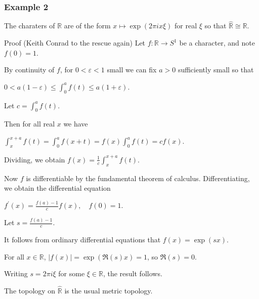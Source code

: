 \documentclass[mathserif
, handout
]{beamer}
\begin{document}
\begin{frame}
    \frametitle{Example 2}
The charaters of $\mathbb{R}$ are of the form $x\mapsto \exp(2\pi i x\xi)$ for real $\xi$ so that $\widehat{\mathbb{R}}\cong\mathbb{R}$.
\pause 
\begin{block}{Proof (Keith Conrad to the rescue again)} %
    Let $f \colon \mathbb{R}\to S^1$ be a character, and note $f(0) = 1$.\pause 

    By continuity of $f$, for $0<\varepsilon<1$ small we can fix $a>0$ sufficiently small so that \begin{center}
        $0<a(1-\varepsilon)\leq \int_0^a f(t)\leq a(1+\varepsilon)$.
    \end{center} Let $c = \int_0^a f(t)$.
\end{block}
\end{frame}

\begin{frame}
    \begin{block}{}
        Then for all real $x$ we have \begin{center}
            $\int_x^{x+a}f(t) = \int_0^a f(x+t) = f(x)\int_0^a f(t) = cf(x)$.
        \end{center} \pause 
        Dividing, we obtain $f(x) = \frac{1}{c}\int_x^{x+a}f(t)$. \pause

        Now $f$ is differentiable by the fundamental theorem of calculus. Differentiating, we obtain the differential equation \begin{center}
            $f^\prime(x) = \frac{f(a)-1}{c} f(x),\quad f(0) = 1$.
        \end{center} Let $s = \frac{f(a)-1}{c}$. \pause 

        It follows from ordinary differential equations that $f(x) = \exp(sx)$. \pause 

        For all $x\in \mathbb{R}$, $|f(x)|= \exp(\Re(s) x)=1$, so $\Re( s) = 0$. \pause 

        Writing $s = 2\pi i \xi$ for some $\xi\in \mathbb{R}$, the result follows. \pushQED{\qed}\qedhere\popQED
    \end{block} The topology on $\widehat{\mathbb{R}}$ is the usual metric topology.
\end{frame}
\end{document}

